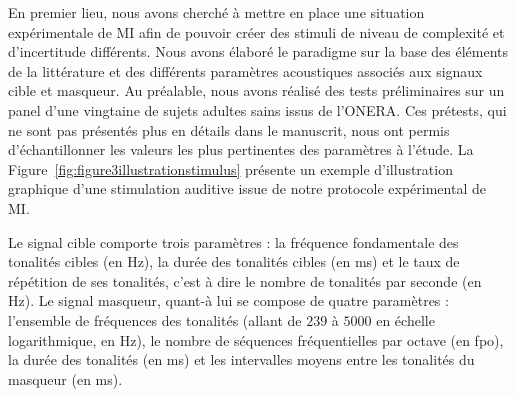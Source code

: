 En premier lieu, nous avons cherché à mettre en place une situation expérimentale de MI afin de pouvoir créer des stimuli de niveau de complexité et d'incertitude différents. 
Nous avons élaboré le paradigme sur la base des éléments de la littérature et des différents paramètres acoustiques associés aux signaux cible et masqueur. 
Au préalable, nous avons réalisé des tests préliminaires sur un panel d'une vingtaine de sujets adultes sains issus de l'ONERA. 
Ces prétests, qui ne sont pas présentés plus en détails dans le manuscrit, nous ont permis d'échantillonner les valeurs les plus pertinentes des paramètres à l'étude.
La Figure~\ref{fig:figure3illustrationstimulus} présente un exemple d'illustration graphique d'une stimulation auditive issue de notre protocole expérimental de MI. 

Le signal cible comporte trois paramètres : la fréquence fondamentale des tonalités cibles (en Hz), la durée des tonalités cibles (en ms) et le taux de répétition de ses tonalités, c'est à dire le nombre de tonalités par seconde (en Hz). 
Le signal masqueur, quant-à lui se compose de quatre paramètres : l'ensemble de fréquences des tonalités (allant de $239$ à $5000$ en échelle logarithmique, en Hz), le nombre de séquences fréquentielles par octave (en fpo), la durée des tonalités (en ms) et les intervalles moyens entre les tonalités du masqueur (en ms). 

